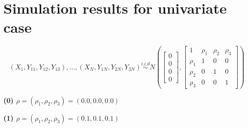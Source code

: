 \documentclass[12pt]{report}
\begin{document}
 





\newpage
\section{Simulation results for univariate case}

\begin{equation} 
\label{eq:latent}
(X_1, Y_{11}, Y_{12}, Y_{13}), ... , (X_N, Y_{1N}, Y_{2N}, Y_{3N})  \overset{i.i.d}{\sim} N \left( \begin{bmatrix} 0 \\ 0 \\ 0 \\ 0 \end{bmatrix}, \begin{bmatrix}1 & \rho_{1} & \rho_{2}&  \rho_{3} \\ \rho_{1} & 1 & 0 & 0 \\ \rho_{2} & 0 & 1 & 0 \\ \rho_{3} & 0 & 0 & 1  \end{bmatrix}  \right)
\end{equation}

\textbf{(0) $\rho = (\rho_{1}, \rho_{2}, \rho_{3}) = (0.0, 0.0, 0.0)$}

\newpage
\textbf{(1) $\rho = (\rho_{1}, \rho_{2}, \rho_{3}) = (0.1, 0.1, 0.1)$}
\end{document}
